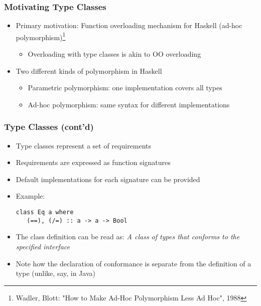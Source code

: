 \documentclass{beamer}
\newcommand{\ttcode}[1]{{\color{red}{\tt{#1}}}}
\begin{document}
\begin{frame}[fragile]
    \frametitle{Motivating Type Classes}
\begin{itemize}
\item Primary motivation: Function overloading mechanism for Haskell 
(ad-hoc polymorphism)\footnote{Wadler, Blott: "How to Make Ad-Hoc Polymorphism Less Ad Hoc", 1988} 
\begin{itemize}
\item Overloading with type classes is akin to OO overloading
\end{itemize}
\item Two different kinds of polymorphism in Haskell
\begin{itemize}
\item Parametric polymorphism: one implementation covers all types 
\item Ad-hoc polymorphism: same syntax for different implementations 
\end{itemize}

\end{itemize}
\end{frame}


\begin{frame}[fragile]
    \frametitle{Type Classes (cont'd)}
\begin{itemize}
\item Type classes represent a set of requirements 
\item Requirements are expressed as function signatures 
\item Default implementations for each signature can be provided 
\item Example: 
{\color{red}
\begin{verbatim}
class Eq a where 
   (==), (/=) :: a -> a -> Bool 
\end{verbatim}
}

\item 
The class definition can be read as: 
{\it A class of types that conforms to the specified interface}

\item
Note how the declaration of conformance is separate from the 
definition of a type (unlike, say, \ttcode{implements} in Java) 
\end{itemize}
\end{frame}
\end{document}

